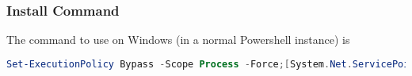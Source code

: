 \subsubsection{Install Command}
The command to use on Windows (in a normal Powershell instance) is



\begin{lstlisting}[language=PowerShell]
  Set-ExecutionPolicy Bypass -Scope Process -Force;[System.Net.ServicePointManager]::SecurityProtocol = [System.Net.ServicePointManager]::SecurityProtocol -bor 3072; try { Invoke-Command -ScriptBlock ([ScriptBlock]::Create((Invoke-WebRequest https://www.haskell.org/ghcup/sh/bootstrap-haskell.ps1 -UseBasicParsing))) -ArgumentList $true } catch { Write-Error $_ }
\end{lstlisting}